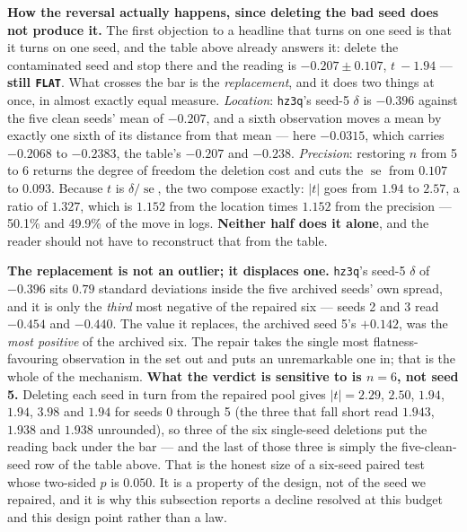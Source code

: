 \documentclass[10pt,letterpaper]{article}
\newcommand{\arm}[1]{\texttt{#1}}
\DeclareMathOperator{\se}{se}
\begin{document}
\textbf{How the reversal actually happens, since deleting the bad seed does not produce it.} The
first objection to a headline that turns on one seed is that it turns on one seed, and the table
above already answers it: delete the contaminated seed and stop there and the reading is
$-0.207 \pm 0.107$, $t\ -1.94$ --- \textbf{still \texttt{FLAT}}. What crosses the bar is the
\emph{replacement}, and it does two things at once, in almost exactly equal measure.
\emph{Location}: \arm{hz3q}'s seed-5 $\delta$ is $-0.396$ against the five clean seeds' mean of
$-0.207$, and a sixth observation moves a mean by exactly one sixth of its distance from that mean
--- here $-0.0315$, which carries $-0.2068$ to $-0.2383$, the table's $-0.207$ and $-0.238$.
\emph{Precision}: restoring $n$ from 5 to 6 returns the degree of freedom the deletion cost and
cuts the $\se$ from $0.107$ to $0.093$. Because $t$ is $\delta/\se$, the two compose exactly:
$|t|$ goes from $1.94$ to $2.57$, a ratio of $1.327$, which is $1.152$ from the location times
$1.152$ from the precision --- 50.1\% and 49.9\% of the move in logs. \textbf{Neither half does it
alone}, and the reader should not have to reconstruct that from the table.

\textbf{The replacement is not an outlier; it displaces one.} \arm{hz3q}'s seed-5 $\delta$ of
$-0.396$ sits $0.79$ standard deviations inside the five archived seeds' own spread, and it is only
the \emph{third} most negative of the repaired six --- seeds 2 and 3 read $-0.454$ and $-0.440$.
The value it replaces, the archived seed 5's $+0.142$, was the \emph{most positive} of the archived
six. The repair takes the single most flatness-favouring observation in the set out and puts an
unremarkable one in; that is the whole of the mechanism. \textbf{What the verdict is sensitive to
is $n = 6$, not seed 5.} Deleting each seed in turn from the repaired pool gives $|t| = 2.29$,
$2.50$, $1.94$, $1.94$, $3.98$ and $1.94$ for seeds 0 through 5 (the three that fall short read
$1.943$, $1.938$ and $1.938$ unrounded), so three of the six single-seed deletions put the reading
back under the bar --- and the last of those three is simply the five-clean-seed row of the table
above. That is the honest size of a six-seed paired test whose two-sided $p$ is $0.050$. It is a
property of the design, not of the seed we repaired, and it is why this subsection reports a
decline resolved at this budget and this design point rather than a law.
\end{document}
